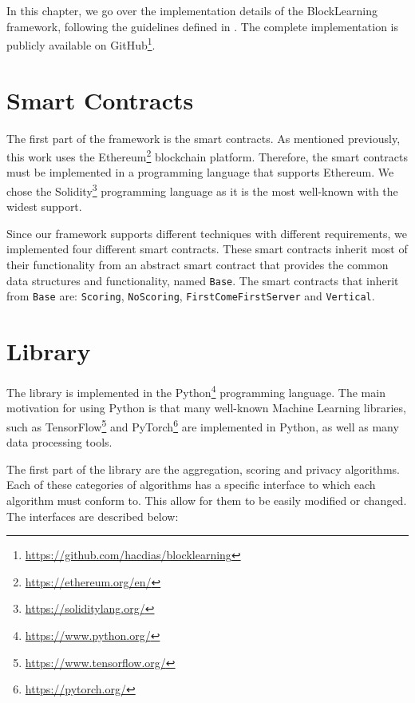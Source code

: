 In this chapter, we go over the implementation details of the BlockLearning framework, following the guidelines defined in . The complete implementation is publicly available on GitHub\footnote{\url{https://github.com/hacdias/blocklearning}}.

\section{Smart Contracts}

The first part of the framework is the smart contracts. As mentioned previously, this work uses the Ethereum\footnote{\url{https://ethereum.org/en/}} blockchain platform. Therefore, the smart contracts must be implemented in a programming language that supports Ethereum. We chose the Solidity\footnote{\url{https://soliditylang.org/}} programming language as it is the most well-known with the widest support.

Since our framework supports different techniques with different requirements, we implemented four different smart contracts. These smart contracts inherit most of their functionality from an abstract smart contract that provides the common data structures and functionality, named \texttt{Base}. The smart contracts that inherit from \texttt{Base} are: \texttt{Scoring}, \texttt{NoScoring}, \texttt{FirstComeFirstServer} and \texttt{Vertical}. 


\section{Library}

The library is implemented in the Python\footnote{\url{https://www.python.org/}} programming language. The main motivation for using Python is that many well-known Machine Learning libraries, such as TensorFlow\footnote{\url{https://www.tensorflow.org/}} and PyTorch\footnote{\url{https://pytorch.org/}} are implemented in Python, as well as many data processing tools.

The first part of the library are the aggregation, scoring and privacy algorithms. Each of these categories of algorithms has a specific interface to which each algorithm must conform to. This allow for them to be easily modified or changed. The interfaces are described below:


